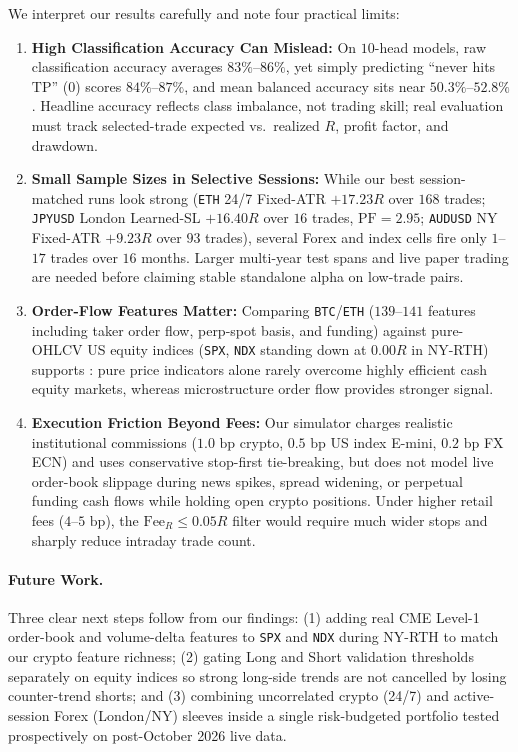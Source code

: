 \documentclass{article}
\newcommand{\FeeR}{\mathrm{Fee}_R}
\newcommand{\TP}{\mathrm{TP}}
\newcommand{\PF}{\mathrm{PF}}
\begin{document}
We interpret our results carefully and note four practical limits:

\begin{enumerate}
    \item \textbf{High Classification Accuracy Can Mislead:} On $10$-head models, raw classification accuracy averages $83\%$--$86\%$, yet simply predicting ``never hits $\TP$'' ($0$) scores $84\%$--$87\%$, and mean balanced accuracy sits near $50.3\%$--$52.8\%$. Headline accuracy reflects class imbalance, not trading skill; real evaluation must track selected-trade expected vs.\ realized $R$, profit factor, and drawdown.
    \item \textbf{Small Sample Sizes in Selective Sessions:} While our best session-matched runs look strong (\texttt{ETH} 24/7 Fixed-ATR $+17.23R$ over $168$ trades; \texttt{JPYUSD} London Learned-SL $+16.40R$ over $16$ trades, $\PF = 2.95$; \texttt{AUDUSD} NY Fixed-ATR $+9.23R$ over $93$ trades), several Forex and index cells fire only $1$--$17$ trades over $16$ months. Larger multi-year test spans and live paper trading are needed before claiming stable standalone alpha on low-trade pairs.
    \item \textbf{Order-Flow Features Matter:} Comparing \texttt{BTC}/\texttt{ETH} ($139$--$141$ features including taker order flow, perp-spot basis, and funding) against pure-OHLCV US equity indices (\texttt{SPX}, \texttt{NDX} standing down at $0.00R$ in NY-RTH) supports \citet{Bustos2025}: pure price indicators alone rarely overcome highly efficient cash equity markets, whereas microstructure order flow provides stronger signal.
    \item \textbf{Execution Friction Beyond Fees:} Our simulator charges realistic institutional commissions ($1.0\text{ bp}$ crypto, $0.5\text{ bp}$ US index E-mini, $0.2\text{ bp}$ FX ECN) and uses conservative stop-first tie-breaking, but does not model live order-book slippage during news spikes, spread widening, or perpetual funding cash flows while holding open crypto positions. Under higher retail fees ($4$--$5\text{ bp}$), the $\FeeR \le 0.05R$ filter would require much wider stops and sharply reduce intraday trade count.
\end{enumerate}

\paragraph{Future Work.}
Three clear next steps follow from our findings: (1) adding real CME Level-1 order-book and volume-delta features to \texttt{SPX} and \texttt{NDX} during NY-RTH to match our crypto feature richness; (2) gating Long and Short validation thresholds separately on equity indices so strong long-side trends are not cancelled by losing counter-trend shorts; and (3) combining uncorrelated crypto (24/7) and active-session Forex (London/NY) sleeves inside a single risk-budgeted portfolio tested prospectively on post-October 2026 live data.
\end{document}
